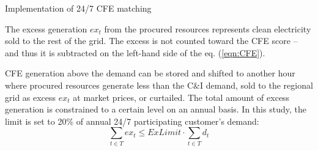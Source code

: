 \begin{frame}{Implementation of 24/7 CFE matching}

  {\small

  The excess generation $ex_t$ from the procured resources represents clean electricity sold to the rest of the grid. 
  The \alert{excess is not counted toward the CFE score} -- 
  and thus it is subtracted on the left-hand side of the eq. (\ref{eqn:CFE}).

  CFE generation above the demand can be stored and shifted to another hour where procured resources 
  generate less than the C\&I demand, sold to the regional grid as excess $ex_t$
  at market prices, or curtailed. 
  The total amount of excess generation is constrained to a certain level on an annual basis. 
  In this study, the limit is set to 20\% of annual 24/7 participating customer's demand:
  \vspace{0.1cm}
  \begin{equation}
  \sum_{t\in T} ex_t \leq ExLimit \cdot \sum_{t\in T} d_t
  \label{eqn:excess}
  \end{equation}

  \noindent{}
  }

\end{frame}



